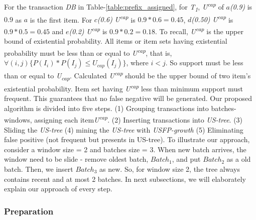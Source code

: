 \documentclass[conference]{IEEEtran}
\begin{document}
For the transaction \emph{DB} in Table-\ref{table:prefix_assigned}, for \emph{T\textsubscript{1}}, \emph{U\textsuperscript{cap}} of \emph{$a$(0.9)} is $0.9$ as $a$ is the first item. For \emph{$c$(0.6)} \emph{U\textsuperscript{cap}} is $0.9*0.6=0.45$, \emph{$d$(0.50)} \emph{U\textsuperscript{cap}} is $0.9*0.5=0.45$ and \emph{$e$(0.2)} \emph{U\textsuperscript{cap}} is $0.9*0.2=0.18$. To recall, \emph{U\textsuperscript{cap}} is the upper bound of existential probability. All items or item sets having existential probability must be less than or equal to \emph{U\textsuperscript{cap}}, that is, $\forall(i,j)\{ P(I_i)*P(I_j)\leq U_{cap}(I_j)\}$, where $i < j$. So support must be less than or equal to \emph{U\textsubscript{cap}}. Calculated \emph{U\textsuperscript{cap}} should be the upper bound of two item's existential probability. Item set having \emph{U\textsuperscript{cap}} less than minimum support must frequent. This guarantees that no false negative will be generated.
Our proposed algorithm is divided into five steps. (1) Grouping transactions into batches-windows, assigning each item\emph{U\textsuperscript{cap}}. (2) Inserting transactions into \emph {US-tree}. (3) Sliding the \emph {US-tree} (4) mining the \emph {US-tree} with \emph{USFP-growth} (5) Eliminating false positive (not frequent but presents in US-tree). To illustrate our approach, consider a window size = 2 and batches size = 3. When new batch arrives, the window need to be slide - remove oldest batch, $Batch_1$, and put $Batch_2$ as a old batch. Then, we insert $Batch_3$ as new. So, for window size 2, the tree always contains recent and at most 2 batches. In next subsections, we will elaborately explain our approach of every step.

\subsubsection{Preparation}

%
\end{document}
